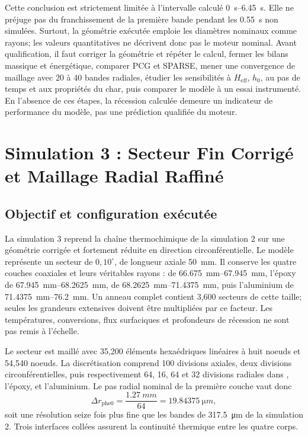 \documentclass[oneside,openany]{amsdtx}
\begin{document}
Cette conclusion est strictement limitée à l'intervalle calculé
\SIrange{0}{6.45}{s}. Elle ne préjuge pas du franchissement de la première
bande pendant les \SI{0.55}{s} non simulées. Surtout, la géométrie exécutée
emploie les diamètres nominaux comme rayons; les valeurs quantitatives ne
décrivent donc pas le moteur nominal. Avant qualification, il faut corriger la
géométrie et répéter le calcul, fermer les bilans massique et énergétique,
comparer PCG et SPARSE, mener une convergence de maillage avec 20 à 40 bandes
radiales, étudier les sensibilités à \(H_\mathrm{eff}\), \(h_0\), au pas de
temps et aux propriétés du char, puis comparer le modèle à un essai
instrumenté. En l'absence de ces étapes, la récession calculée demeure un
indicateur de performance du modèle, pas une prédiction qualifiée du moteur.

\clearpage
\section{Simulation 3 : Secteur Fin Corrigé et Maillage Radial Raffiné}

\subsection{Objectif et configuration exécutée}

La simulation 3 reprend la chaîne thermochimique de la simulation 2 sur une
géométrie corrigée et fortement réduite en direction circonférentielle. Le
modèle représente un secteur de \(0{,}10^\circ\), de longueur axiale
\SI{50}{mm}. Il conserve les quatre couches coaxiales et leurs véritables
rayons :  de \SIrange{66.675}{67.945}{mm}, l'époxy de
\SIrange{67.945}{68.2625}{mm},  de
\SIrange{68.2625}{71.4375}{mm}, puis l'aluminium de
\SIrange{71.4375}{76.2}{mm}. Un anneau complet contient 3,600 secteurs de
cette taille; seules les grandeurs extensives doivent être multipliées par ce
facteur. Les températures, conversions, flux surfaciques et profondeurs de
récession ne sont pas remis à l'échelle.

Le secteur est maillé avec 35,200 éléments hexaédriques linéaires à huit
noeuds et 54,540 noeuds. La discrétisation comprend 100 divisions axiales,
deux divisions circonférentielles, puis respectivement 64, 16, 64 et 32
divisions radiales dans , l'époxy,  et l'aluminium. Le
pas radial nominal de la première couche vaut donc
\[
  \Delta r_\mathrm{phe0}=\frac{\SI{1.27}{mm}}{64}
  =\SI{19.84375}{\micro m},
\]
soit une résolution seize fois plus fine que les bandes de
\SI{317.5}{\micro m} de la simulation 2. Trois interfaces collées assurent la
continuité thermique entre les quatre corps.
\end{document}
